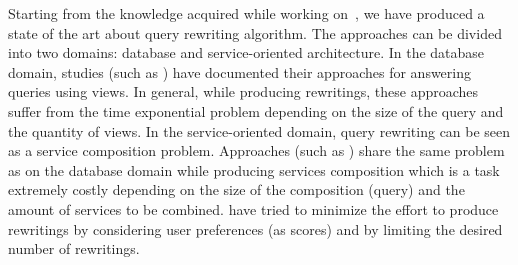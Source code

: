 \documentclass[11pt,a4paper,oneside]{report}
\begin{document}

Starting from the knowledge acquired while working on~\cite{ba2014}, we have produced a state of the art about query rewriting algorithm. The approaches can be divided into two domains: database and service-oriented architecture. In the database domain, studies (such as \cite{Duschka:1997,Levy:1996,Pottinger:2001}) have documented their approaches for answering queries using views. In general, while producing rewritings, these approaches suffer from the time exponential problem depending on the size of the query and the quantity of views. In the service-oriented domain, query rewriting can be seen as a service composition problem. Approaches (such as \cite{Barhamgi2010,Benouaret2011,Umberto}) share the same problem as on the database domain while producing services composition which is a task extremely costly depending on the size of the composition (query) and the amount of services to be combined. \cite{ba2014} have tried to minimize the effort to produce rewritings by considering user preferences (as scores) and by limiting the desired number of rewritings.
\end{document}
